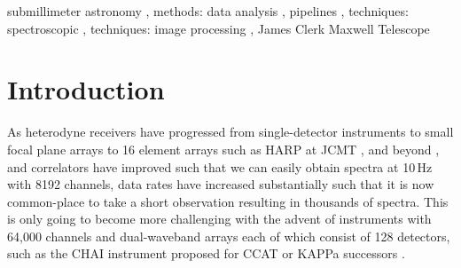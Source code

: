 \documentclass[final,authoryear,5p,times,twocolumn]{elsarticle}
\begin{document}
\begin{frontmatter}
\begin{abstract}
\end{abstract}

\begin{keyword}


submillimeter astronomy \sep
methods: data analysis \sep
pipelines \sep
techniques: spectroscopic \sep
techniques: image processing \sep
James Clerk Maxwell Telescope

\end{keyword}

\end{frontmatter}


\newcommand{\mnras}{Mon Not R Astron Soc}
\newcommand{\aap}{Astron Astrophys}
\newcommand{\pasp}{Pub Astron Soc Pacific}
\newcommand{\apj}{Astrophys J}
\newcommand{\apjs}{Astrophys J Supp}
\newcommand{\qjras}{Quart J R Astron Soc}
\newcommand{\an}{Astron.\ Nach.}
\newcommand{\ijimw}{Int.\ J.\ Infrared \& Millimeter Waves}
\newcommand{\procspie}{Proc.\ SPIE}
\newcommand{\aspconf}{ASP Conf. Ser.}

\newcommand{\KAPPA}{\textsc{kappa}}
\newcommand{\specx}{\textsc{specx}}
\newcommand{\cupid}{\textsc{cupid}}
\newcommand{\smurf}{\textsc{smurf}}

\newcommand{\makecube}{\textsc{makecube}}
\newcommand{\unmakecube}{\textsc{unmakecube}}
\newcommand{\mfittrend}{\textsc{mfittrend}}
\newcommand{\gsdacsis}{\textsc{gsd{\footnotesize{2}}acsis}}
\newcommand{\findback}{\textsc{findback}}
\newcommand{\findclumps}{\textsc{findclumps}}
\newcommand{\fixsteps}{\textsc{fixsteps}}

\newcommand{\ascl}[1]{\href{http://www.ascl.net/#1}{ascl:#1}}

\section{Introduction}
\label{sec:intro}

As heterodyne receivers have progressed from single-detector
instruments
\citep{1992IJIMW..13.1487P,1992IJIMW..13..647D,1992IJIMW..13.1827C} to
small focal plane arrays
\citep{2003SPIE.4855..322G,2004A&A...423.1171S} to 16 element arrays
such as HARP at JCMT \citep{2009MNRAS.399.1026B}, and beyond
\citep{2012SPIE.8452E..04K,2014SPIE.9153E..27H}, and correlators have improved such that
we can easily obtain spectra at 10\,Hz with 8192 channels, data rates
have increased substantially such that it is now common-place to take
a short observation resulting in thousands of spectra. This is only
going to become more challenging with the advent of instruments with
64,000 channels and dual-waveband arrays each of which consist of 128
detectors, such as the CHAI instrument proposed for CCAT
\citep{2014SPIE9152-109}
or KAPPa successors \citep{2014SPIE.9153E..0KW}.
\end{document}
